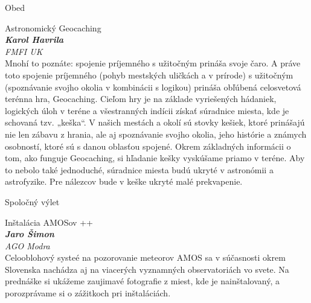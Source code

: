 \documentclass[a4paper]{report}
\begin{document}
                    \begin{tcolorbox}[
                                    colback=red!10,
                    colframe=red!50!black,
                                fonttitle=\Large\bfseries,
                title=12:30
            ]
                {\Large Obed}
                                                            \end{tcolorbox}
                    \begin{tcolorbox}[
                                    colback=blue!10,
                    colframe=black!50!blue,
                                fonttitle=\Large\bfseries,
                title=14:00
            ]
                {\Large Astronomický Geocaching}
                                                            \\ \textbf{\textit{Karol Havrila}}
                                                    \\ \textit{FMFI UK}                \\[2ex]Mnohí to poznáte: spojenie príjemného s užitočným prináša svoje čaro. A práve toto spojenie príjemného (pohyb mestských uličkách a v prírode) s užitočným (spoznávanie svojho okolia v kombinácii s logikou) prináša obľúbená celosvetová terénna hra, Geocaching. Cieľom hry je na základe vyriešených hádaniek, logických úloh v teréne a všestranných indícii získať súradnice miesta, kde je schovaná tzv. „keška“. V našich mestách a okolí sú stovky kešiek, ktoré prinášajú nie len zábavu z hrania, ale aj spoznávanie svojho okolia, jeho histórie a známych osobností, ktoré sú s danou oblasťou spojené. Okrem základných informácii o tom, ako funguje Geocaching, si hľadanie kešky vyskúšame priamo v teréne. Aby to nebolo také jednoduché, súradnice miesta budú ukryté v astronómii a astrofyzike. Pre nálezcov bude v keške ukryté malé prekvapenie.
            \end{tcolorbox}
                    \begin{tcolorbox}[
                                    colback=green!10,
                    colframe=green!50!black,
                                fonttitle=\Large\bfseries,
                title=15:00
            ]
                {\Large Spoločný výlet}
                                                            \end{tcolorbox}
                    \begin{tcolorbox}[
                                    colback=white,
                    colframe=black!70!white,
                                fonttitle=\Large\bfseries,
                title=17:00
            ]
                {\Large Inštalácia AMOSov ++}
                                                            \\ \textbf{\textit{Jaro Šimon}}
                                                    \\ \textit{AGO Modra}                \\[2ex]Celooblohový systeé na pozorovanie meteorov AMOS sa v súčasnosti okrem Slovenska nachádza aj na viacerých vyznamných observatoriách vo svete. Na prednáške si ukážeme zaujimavé fotografie z miest, kde je nainštalovaný, a porozprávame si o zážitkoch pri inštaláciách.
            \end{tcolorbox}
\end{document}
